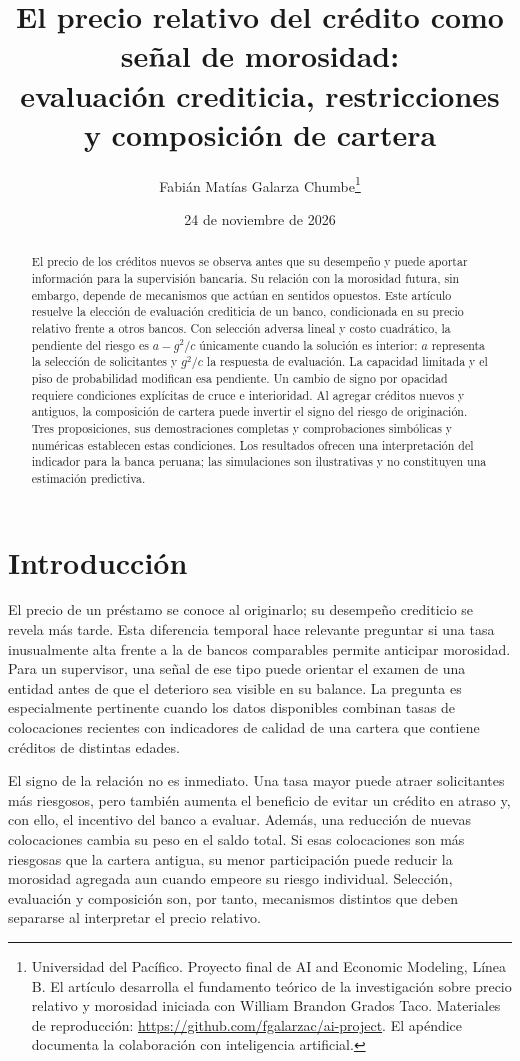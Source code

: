 \documentclass[11pt]{article}
\title{El precio relativo del crédito como señal de morosidad:\\
\large evaluación crediticia, restricciones y composición de cartera}
\author{Fabián Matías Galarza Chumbe\thanks{Universidad del Pacífico.
Proyecto final de AI and Economic Modeling, Línea B. El artículo desarrolla
el fundamento teórico de la investigación sobre precio relativo y morosidad
iniciada con William Brandon Grados Taco. Materiales de reproducción:
\url{https://github.com/fgalarzac/ai-project}. El apéndice documenta la
colaboración con inteligencia artificial.}}
\date{24 de noviembre de 2026}
\theoremstyle{definition}\newtheorem{assumption}{Supuesto}
\begin{document}
\maketitle
\begin{abstract}
El precio de los créditos nuevos se observa antes que su desempeño y puede
aportar información para la supervisión bancaria. Su relación con la morosidad
futura, sin embargo, depende de mecanismos que actúan en sentidos opuestos.
Este artículo resuelve la elección de evaluación crediticia de un banco,
condicionada en su precio relativo frente a otros bancos. Con selección
adversa lineal y costo cuadrático, la pendiente del riesgo es $a-g^2/c$
únicamente cuando la solución es interior: $a$ representa la selección de
solicitantes y $g^2/c$ la respuesta de evaluación. La capacidad limitada y
el piso de probabilidad modifican esa pendiente. Un cambio de signo por
opacidad requiere condiciones explícitas de cruce e interioridad. Al agregar
créditos nuevos y antiguos, la composición de cartera puede invertir el signo
del riesgo de originación. Tres proposiciones, sus demostraciones completas
y comprobaciones simbólicas y numéricas establecen estas condiciones. Los
resultados ofrecen una interpretación del indicador para la banca peruana;
las simulaciones son ilustrativas y no constituyen una estimación predictiva.
\end{abstract}

\section{Introducción}
El precio de un préstamo se conoce al originarlo; su desempeño crediticio se
revela más tarde. Esta diferencia temporal hace relevante preguntar si una
tasa inusualmente alta frente a la de bancos comparables permite anticipar
morosidad. Para un supervisor, una señal de ese tipo puede orientar el examen
de una entidad antes de que el deterioro sea visible en su balance. La
pregunta es especialmente pertinente cuando los datos disponibles combinan
tasas de colocaciones recientes con indicadores de calidad de una cartera
que contiene créditos de distintas edades.

El signo de la relación no es inmediato. Una tasa mayor puede atraer
solicitantes más riesgosos, pero también aumenta el beneficio de evitar un
crédito en atraso y, con ello, el incentivo del banco a evaluar. Además, una
reducción de nuevas colocaciones cambia su peso en el saldo total. Si esas
colocaciones son más riesgosas que la cartera antigua, su menor participación
puede reducir la morosidad agregada aun cuando empeore su riesgo individual.
Selección, evaluación y composición son, por tanto, mecanismos distintos que
deben separarse al interpretar el precio relativo.
\end{document}
